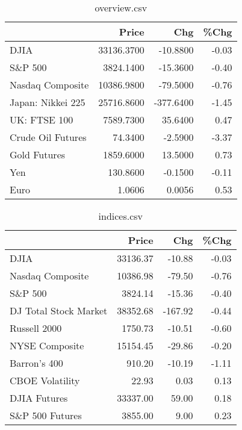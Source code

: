 \documentclass{article}%
\begin{document}
\begin{table}[htbp]%
\caption{overview.csv}%
\centering%
\begin{adjustbox}{width=1\textwidth}%
\begin{tabular}{lrrr}
\toprule
                  &      Price &       Chg &  \%Chg \\
\midrule
             DJIA & 33136.3700 &  -10.8800 & -0.03 \\
          S\&P 500 &  3824.1400 &  -15.3600 & -0.40 \\
 Nasdaq Composite & 10386.9800 &  -79.5000 & -0.76 \\
Japan: Nikkei 225 & 25716.8600 & -377.6400 & -1.45 \\
     UK: FTSE 100 &  7589.7300 &   35.6400 &  0.47 \\
Crude Oil Futures &    74.3400 &   -2.5900 & -3.37 \\
     Gold Futures &  1859.6000 &   13.5000 &  0.73 \\
              Yen &   130.8600 &   -0.1500 & -0.11 \\
             Euro &     1.0606 &    0.0056 &  0.53 \\
\bottomrule
\end{tabular}
%
\end{adjustbox}%
\end{table}

%


\begin{table}[htbp]%
\caption{indices.csv}%
\centering%
\begin{adjustbox}{width=1\textwidth}%
\begin{tabular}{lrrr}
\toprule
                      &    Price &     Chg &  \%Chg \\
\midrule
                 DJIA & 33136.37 &  -10.88 & -0.03 \\
     Nasdaq Composite & 10386.98 &  -79.50 & -0.76 \\
              S\&P 500 &  3824.14 &  -15.36 & -0.40 \\
DJ Total Stock Market & 38352.68 & -167.92 & -0.44 \\
         Russell 2000 &  1750.73 &  -10.51 & -0.60 \\
       NYSE Composite & 15154.45 &  -29.86 & -0.20 \\
         Barron's 400 &   910.20 &  -10.19 & -1.11 \\
      CBOE Volatility &    22.93 &    0.03 &  0.13 \\
         DJIA Futures & 33337.00 &   59.00 &  0.18 \\
      S\&P 500 Futures &  3855.00 &    9.00 &  0.23 \\
\bottomrule
\end{tabular}
%
\end{adjustbox}%
\end{table}
\end{document}
